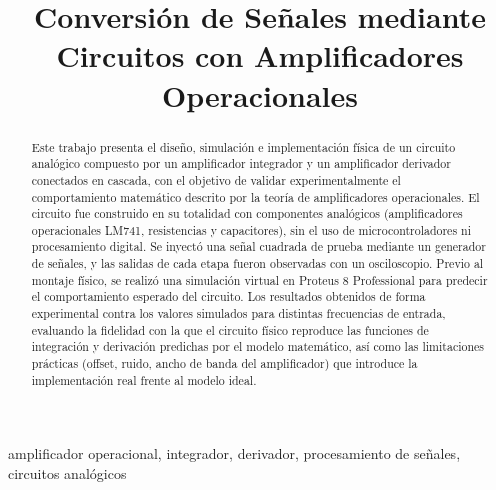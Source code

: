 \documentclass[conference]{IEEEtran}
\begin{document}
\title{Conversión de Señales mediante Circuitos con Amplificadores Operacionales\\}
\author{
    \and
}

\maketitle

\begin{abstract}
Este trabajo presenta el diseño, simulación e implementación física de un circuito analógico compuesto por un amplificador integrador y un amplificador derivador conectados en cascada, con el objetivo de validar experimentalmente el comportamiento matemático descrito por la teoría de amplificadores operacionales. El circuito fue construido en su totalidad con componentes analógicos (amplificadores operacionales LM741, resistencias y capacitores), sin el uso de microcontroladores ni procesamiento digital. Se inyectó una señal cuadrada de prueba mediante un generador de señales, y las salidas de cada etapa fueron observadas con un osciloscopio. Previo al montaje físico, se realizó una simulación virtual en Proteus 8 Professional para predecir el comportamiento esperado del circuito. Los resultados obtenidos de forma experimental contra los valores simulados para distintas frecuencias de entrada, evaluando la fidelidad con la que el circuito físico reproduce las funciones de integración y derivación predichas por el modelo matemático, así como las limitaciones prácticas (offset, ruido, ancho de banda del amplificador) que introduce la implementación real frente al modelo ideal.\\
\end{abstract}

\begin{IEEEkeywords}
amplificador operacional, integrador, derivador, procesamiento de señales, circuitos analógicos
\end{IEEEkeywords}
\end{document}
